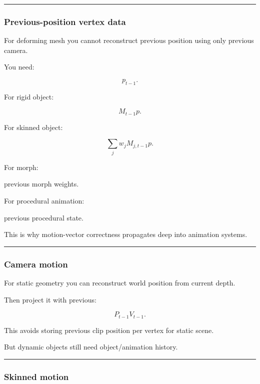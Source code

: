 \begin{center}\rule{0.5\linewidth}{0.5pt}\end{center}

\subsubsection{Previous-position vertex data}\label{previous-position-vertex-data}

For deforming mesh you cannot reconstruct previous position using only previous camera.

You need:

\[
p_{t-1}.
\]

For rigid object:

\[
M_{t-1}p.
\]

For skinned object:

\[
\sum_j
w_j
M_{j,t-1}p.
\]

For morph:

previous morph weights.

For procedural animation:

previous procedural state.

This is why motion-vector correctness propagates deep into animation systems.

\begin{center}\rule{0.5\linewidth}{0.5pt}\end{center}

\subsubsection{Camera motion}\label{camera-motion}

For static geometry you can reconstruct world position from current depth.

Then project it with previous:

\[
P_{t-1}V_{t-1}.
\]

This avoids storing previous clip position per vertex for static scene.

But dynamic objects still need object/animation history.

\begin{center}\rule{0.5\linewidth}{0.5pt}\end{center}

\subsubsection{Skinned motion}\label{skinned-motion}

